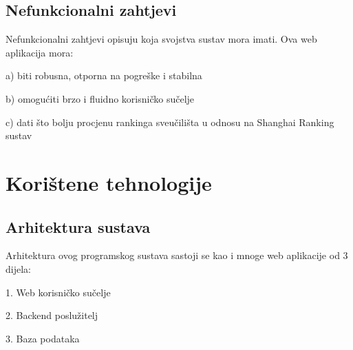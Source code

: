 \documentclass[times, utf8, zavrsni]{fer}
\begin{document}
\section{Nefunkcionalni zahtjevi}
Nefunkcionalni zahtjevi opisuju koja svojstva sustav mora imati. Ova web aplikacija mora:

a) biti robusna, otporna na pogreške i stabilna

b) omogućiti brzo i fluidno korisničko sučelje

c) dati što bolju procjenu rankinga sveučilišta u odnosu na Shanghai Ranking sustav

\chapter{Korištene tehnologije}
\section{Arhitektura sustava}
Arhitektura ovog programskog sustava sastoji se kao i mnoge web aplikacije od 3 dijela:

1. Web korisničko sučelje

2. Backend poslužitelj

3. Baza podataka
\end{document}
